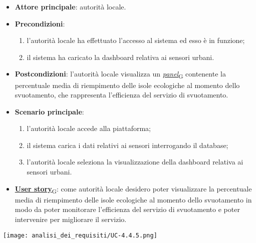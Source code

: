 \begin{itemize}
	\item \textbf{Attore principale}: autorità locale.
	\item \textbf{Precondizioni}:
	      \begin{enumerate}
		      \item l'autorità locale ha effettuato l'accesso al sistema ed esso è in funzione;
		      \item il sistema ha caricato la dashboard relativa ai sensori urbani.
	      \end{enumerate}
	\item \textbf{Postcondizioni}: l'autorità locale visualizza un \href{https://7last.github.io/docs/pb/documentazione-interna/glossario\#panel}{\textit{panel}\textsubscript{G}} contenente la percentuale media di riempimento delle isole ecologiche al momento dello svuotamento,
	      che rappresenta l'efficienza del servizio di svuotamento.
	\item \textbf{Scenario principale}:
	      \begin{enumerate}
		      \item l'autorità locale accede alla piattaforma;
		      \item il sistema carica i dati relativi ai sensori interrogando il database;
		      \item l'autorità locale seleziona la visualizzazione della dashboard relativa ai sensori urbani.
	      \end{enumerate}
	\item \href{https://7last.github.io/docs/pb/documentazione-interna/glossario\#user-story}{\textbf{User story}\textsubscript{G}}:
	      come autorità locale desidero poter visualizzare la percentuale media di riempimento delle isole ecologiche al momento dello svuotamento in modo da poter monitorare
	      l'efficienza del servizio di svuotamento e poter intervenire per migliorare il servizio.
\end{itemize}
\begin{center}
	\texttt{[image: analisi\_dei\_requisiti/UC-4.4.5.png]}
\end{center}

